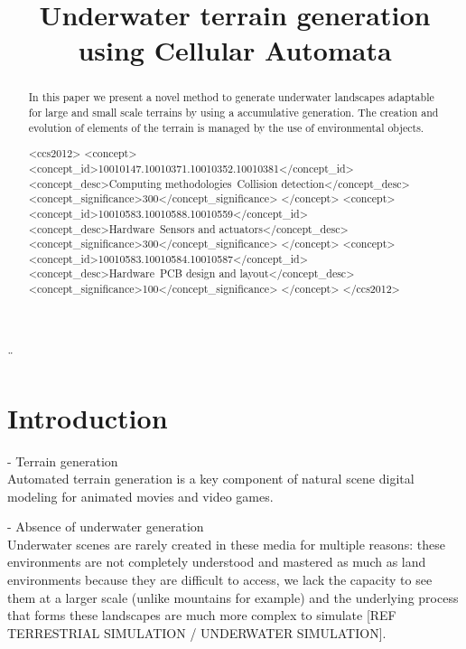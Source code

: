 \documentclass{egpubl}
\title[Underwater terrain generation]%
{Underwater terrain generation using Cellular Automata}
\author[]{}
\begin{document}

\maketitle
¨\begin{abstract}
	In this paper we present a novel method to generate underwater landscapes adaptable for large and small scale terrains by using a accumulative generation. The creation and evolution of elements of the terrain is managed by the use of environmental objects.
	\begin{CCSXML}
		<ccs2012>
		<concept>
		<concept_id>10010147.10010371.10010352.10010381</concept_id>
		<concept_desc>Computing methodologies~Collision detection</concept_desc>
		<concept_significance>300</concept_significance>
		</concept>
		<concept>
		<concept_id>10010583.10010588.10010559</concept_id>
		<concept_desc>Hardware~Sensors and actuators</concept_desc>
		<concept_significance>300</concept_significance>
		</concept>
		<concept>
		<concept_id>10010583.10010584.10010587</concept_id>
		<concept_desc>Hardware~PCB design and layout</concept_desc>
		<concept_significance>100</concept_significance>
		</concept>
		</ccs2012>
	\end{CCSXML}
	
	
	
	\printccsdesc   
\end{abstract}  


\section{Introduction}
- Terrain generation \\ 
Automated terrain generation is a key component of natural scene digital modeling for animated movies and video games. 

- Absence of underwater generation \\
Underwater scenes are rarely created in these media for multiple reasons: these environments are not completely understood and mastered as much as land environments because they are difficult to access, we lack the capacity to see them at a larger scale (unlike mountains for example) and the underlying process that forms these landscapes are much more complex to simulate [REF TERRESTRIAL SIMULATION / UNDERWATER SIMULATION].
\end{document}
